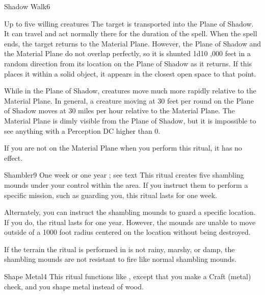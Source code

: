 \begin{spellsection}{Shadow Walk}{6}
\spelldur \durext \dismissable
\begin{spelltargets}{Up to five willing creatures}
    \spelleffect The target is transported into the Plane of Shadow. It can travel and act normally there for the duration of the spell. When the spell ends, the target returns to the Material Plane. However, the Plane of Shadow and the Material Plane do not overlap perfectly, so it is shunted 1d10 ,000 feet in a random direction from its location on the Plane of Shadow as it returns. If this places it within a solid object, it appears in the closest open space to that point.
\end{spelltargets}
\spellnotes While in the Plane of Shadow, creatures move much more rapidly relative to the Material Plane. In general, a creature moving at 30 feet per round on the Plane of Shadow moves at 30 miles per hour relative to the Material Plane. The Material Plane is dimly visible from the Plane of Shadow, but it is impossible to see anything with a Perception DC higher than 0.

If you are not on the Material Plane when you perform this ritual, it has no effect.
\end{spellsection}

\begin{spellsection}{Shambler}{9}
\spelldur One week or one year \dismissable; see text
\spellline
\spelleffect This ritual creates five shambling mounds under your control within the area. If you instruct them to perform a specific mission, such as guarding you, this ritual lasts for one week.

Alternately, you can instruct the shambling mounds to guard a specific location. If you do, the ritual lasts for one year. However, the mounds are unable to move outside of a 1000 foot radius centered on the location without being destroyed.

\spellnotes If the terrain the ritual is performed in is not rainy, marshy, or damp, the shambling mounds are not resistant to fire like normal shambling mounds.
\end{spellsection}

\begin{spellsection}{Shape Metal}{4}
\spellspecial This ritual functions like , except that you make a Craft (metal) check, and you shape metal instead of wood. 
\end{spellsection}


